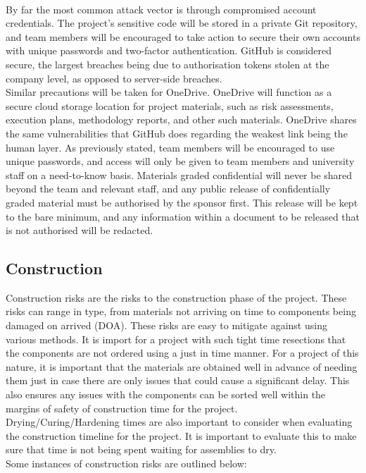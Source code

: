 \documentclass [12pt]{article}
\begin{document}
\\
By far the most common attack vector is through compromised account credentials. The project’s sensitive code will be stored in a private Git repository, and team members will be encouraged to take action to secure their own accounts with unique passwords and two-factor authentication. GitHub is considered secure, the largest breaches being due to authorisation tokens stolen at the company level, as opposed to server-side breaches.
\\
Similar precautions will be taken for OneDrive. OneDrive will function as a secure cloud storage location for project materials, such as risk assessments, execution plans, methodology reports, and other such materials. OneDrive shares the same vulnerabilities that GitHub does regarding the weakest link being the human layer. As previously stated, team members will be encouraged to use unique passwords, and access will only be given to team members and university staff on a need-to-know basis.
Materials graded confidential will never be shared beyond the team and relevant staff, and any public release of confidentially graded material must be authorised by the sponsor first. This release will be kept to the bare minimum, and any information within a document to be released that is not authorised will be redacted.

\subsection{Construction}\label{sec:Construction_Risk}

Construction risks are the risks to the construction phase of the project. These risks can range in type, from materials not arriving on time to components being damaged on arrived (DOA). These risks are easy to mitigate against using various methods. It is import for a project with such tight time resections that the components are not ordered using a just in time \cite{Just-In-Time_Manufacturing} manner. For a project of this nature, it is important that the materials are obtained well in advance of needing them just in case there are only issues that could cause a significant delay. This also ensures any issues with the components can be sorted well within the margins of safety of construction time for the project.
\\
Drying/Curing/Hardening times are also important to consider when evaluating the construction timeline for the project. It is important to evaluate this to make sure that time is not being spent waiting for assemblies to dry.
\\
Some instances of construction risks are outlined below:
\end{document}

